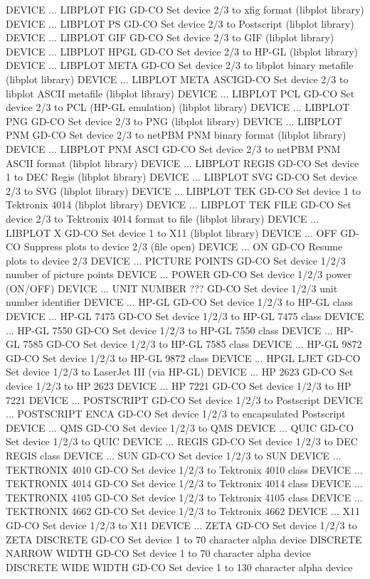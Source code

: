 DEVICE ... LIBPLOT FIG      GD-CO Set device 2/3 to xfig format (libplot library)
DEVICE ... LIBPLOT PS       GD-CO Set device 2/3 to Postscript (libplot library)
DEVICE ... LIBPLOT GIF      GD-CO Set device 2/3 to GIF (libplot library)
DEVICE ... LIBPLOT HPGL     GD-CO Set device 2/3 to HP-GL (libplot library)
DEVICE ... LIBPLOT META     GD-CO Set device 2/3 to libplot binary metafile (libplot library)
DEVICE ... LIBPLOT META ASCIGD-CO Set device 2/3 to libplot ASCII metafile (libplot library)
DEVICE ... LIBPLOT PCL      GD-CO Set device 2/3 to PCL (HP-GL emulation) (libplot library)
DEVICE ... LIBPLOT PNG      GD-CO Set device 2/3 to PNG (libplot library)
DEVICE ... LIBPLOT PNM      GD-CO Set device 2/3 to netPBM PNM binary format (libplot library)
DEVICE ... LIBPLOT PNM ASCI GD-CO Set device 2/3 to netPBM PNM ASCII format (libplot library)
DEVICE ... LIBPLOT REGIS    GD-CO Set device 1 to DEC Regis (libplot library)
DEVICE ... LIBPLOT SVG      GD-CO Set device 2/3 to SVG (libplot library)
DEVICE ... LIBPLOT TEK      GD-CO Set device 1 to Tektronix 4014 (libplot library)
DEVICE ... LIBPLOT TEK FILE GD-CO Set device 2/3 to Tektronix 4014 format to file (libplot library)
DEVICE ... LIBPLOT X        GD-CO Set device 1 to X11 (libplot library)
DEVICE ... OFF              GD-CO Suppress plots to device 2/3 (file open)
DEVICE ... ON               GD-CO Resume plots to device 2/3 
DEVICE ... PICTURE POINTS   GD-CO Set device 1/2/3 number of picture points
DEVICE ... POWER            GD-CO Set device 1/2/3 power (ON/OFF)
DEVICE ... UNIT NUMBER ???  GD-CO Set device 1/2/3 unit number identifier
DEVICE ... HP-GL            GD-CO Set device 1/2/3 to HP-GL class
DEVICE ... HP-GL 7475       GD-CO Set device 1/2/3 to HP-GL 7475 class
DEVICE ... HP-GL 7550       GD-CO Set device 1/2/3 to HP-GL 7550 class
DEVICE ... HP-GL 7585       GD-CO Set device 1/2/3 to HP-GL 7585 class
DEVICE ... HP-GL 9872       GD-CO Set device 1/2/3 to HP-GL 9872 class
DEVICE ... HPGL LJET        GD-CO Set device 1/2/3 to LaserJet III (via HP-GL)
DEVICE ... HP 2623          GD-CO Set device 1/2/3 to HP 2623
DEVICE ... HP 7221          GD-CO Set device 1/2/3 to HP 7221
DEVICE ... POSTSCRIPT       GD-CO Set device 1/2/3 to Postscript
DEVICE ... POSTSCRIPT ENCA  GD-CO Set device 1/2/3 to encapsulated Postscript
DEVICE ... QMS              GD-CO Set device 1/2/3 to QMS
DEVICE ... QUIC             GD-CO Set device 1/2/3 to QUIC
DEVICE ... REGIS            GD-CO Set device 1/2/3 to DEC REGIS class
DEVICE ... SUN              GD-CO Set device 1/2/3 to SUN
DEVICE ... TEKTRONIX 4010   GD-CO Set device 1/2/3 to Tektronix 4010 class
DEVICE ... TEKTRONIX 4014   GD-CO Set device 1/2/3 to Tektronix 4014 class
DEVICE ... TEKTRONIX 4105   GD-CO Set device 1/2/3 to Tektronix 4105 class
DEVICE ... TEKTRONIX 4662   GD-CO Set device 1/2/3 to Tektronix 4662
DEVICE ... X11              GD-CO Set device 1/2/3 to X11
DEVICE ... ZETA             GD-CO Set device 1/2/3 to ZETA
DISCRETE                    GD-CO Set device 1 to 70 character alpha device
DISCRETE NARROW WIDTH       GD-CO Set device 1 to 70 character alpha device
DISCRETE WIDE WIDTH         GD-CO Set device 1 to 130 character alpha device

